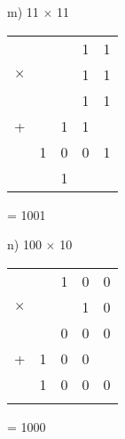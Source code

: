 \begin{figure}[H]
    \begin{minipage}[t]{0.45\textwidth}
        m) 11 $\times$ 11
        \begin{table}[H]
            \centering
            \begin{tabularx}{0.6\linewidth}{rXXXX}
                &  & & 1 & 1 \\
                $\times$ &  &  & 1 & 1 \\
                \cline{4-5}
                &  &  & 1 & 1 \\
                +&  & 1 & 1 &  \\
                \cline{2-5}
                & 1 & 0 & 0 &1 \\
                \cline{2-5}
                &  & 1 &  & \\
            \end{tabularx}
        \end{table}
        = 1001
    \end{minipage}\hfill
    \begin{minipage}[t]{0.45\textwidth}
        n) 100 $\times$ 10
        \begin{table}[H]
            \centering
            \begin{tabularx}{0.6\linewidth}{rXXXX}
                &  & 1 & 0 & 0 \\
                $\times$ &  &  & 1 & 0 \\
                \cline{3-5}
                &  & 0 & 0 & 0 \\
                +& 1 & 0 & 0 &  \\
                \cline{2-5}
                & 1 & 0 & 0 & 0 \\
                \cline{2-5}
                &  &  &  & \\
            \end{tabularx}
        \end{table}
        = 1000
    \end{minipage}\hfill
\end{figure}

